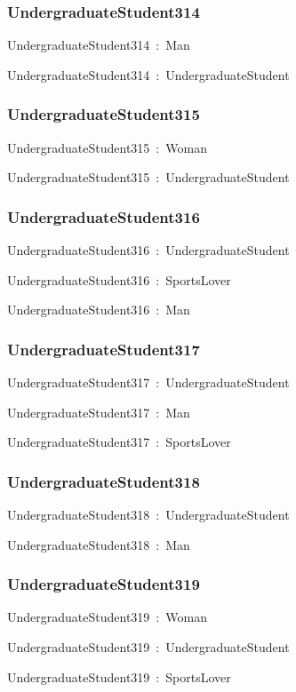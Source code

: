 \documentclass{article}
\begin{document}
\subsubsection*{UndergraduateStudent314}

UndergraduateStudent314~:~Man

UndergraduateStudent314~:~UndergraduateStudent

\subsubsection*{UndergraduateStudent315}

UndergraduateStudent315~:~Woman

UndergraduateStudent315~:~UndergraduateStudent

\subsubsection*{UndergraduateStudent316}

UndergraduateStudent316~:~UndergraduateStudent

UndergraduateStudent316~:~SportsLover

UndergraduateStudent316~:~Man

\subsubsection*{UndergraduateStudent317}

UndergraduateStudent317~:~UndergraduateStudent

UndergraduateStudent317~:~Man

UndergraduateStudent317~:~SportsLover

\subsubsection*{UndergraduateStudent318}

UndergraduateStudent318~:~UndergraduateStudent

UndergraduateStudent318~:~Man

\subsubsection*{UndergraduateStudent319}

UndergraduateStudent319~:~Woman

UndergraduateStudent319~:~UndergraduateStudent

UndergraduateStudent319~:~SportsLover
\end{document}
